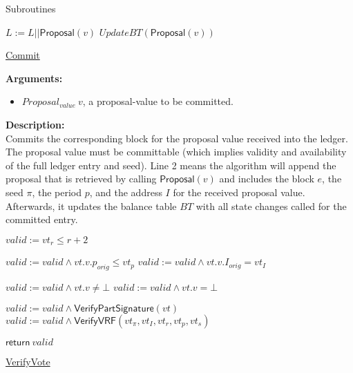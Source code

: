 \documentclass[10pt,a4paper]{article}
\begin{document}
\begin{section}{Subroutines}
\begin{algorithm}[H]
\begin{algorithmic}[1]
    \State $L := L || \mathsf{Proposal}(v)$
    \State $UpdateBT(\mathsf{Proposal}(v))$

    \EndFunction
    \end{algorithmic}
    \caption{\underline{Commit}}
\end{algorithm}


\noindent \textbf{Arguments:}
\begin{itemize}
    \item $Proposal_{value} \ v$, a proposal-value to be committed.
  \end{itemize}

\noindent \textbf{Description:}\\
Commits the corresponding block for the proposal value received into the ledger.
The proposal value must be committable (which implies validity and availability of the full
ledger entry and seed).
Line 2 means the algorithm will append the proposal that is retrieved by calling $\mathsf{Proposal}(v)$ and
includes the block $e$, the seed $\pi$, the period $p$, and the address $I$ for the received proposal value.
Afterwards, it updates the balance table $BT$ with all state changes called for the committed entry.


\begin{algorithm}[H]\label{algo:verify-vote}
    \begin{algorithmic}[1]
        \State $valid := vt_r \leq r+2$
        
            \State $valid := valid \land vt.v.p_{orig} \leq vt_p$
                \State $valid := valid \land vt.v.I_{orig} = vt_I$
            \EndIf
        \EndIf
        
            \State $valid := valid \land vt.v \neq \bot$
            \State $valid := valid \land vt.v = \bot$
        \EndIf

        \State $valid := valid \land \mathsf{VerifyPartSignature}(vt)$
        \State $valid := valid \land \mathsf{VerifyVRF}(vt_{\pi}, vt_I, vt_r, vt_p, vt_s)$

        \State $\mathsf{return} \ valid$
    \EndFunction
    \end{algorithmic}
    \caption{\underline{VerifyVote}}
\end{algorithm}


\end{section}
\end{document}

